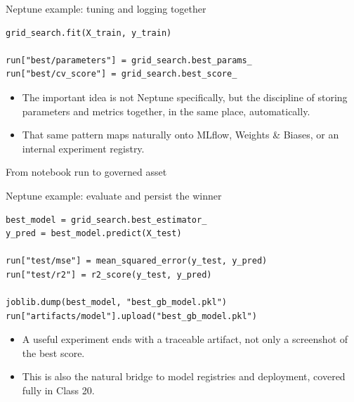 \begin{frame}[fragile]{Neptune example: tuning and logging together}
\begin{lstlisting}[style=coursepython]
grid_search.fit(X_train, y_train)

run["best/parameters"] = grid_search.best_params_
run["best/cv_score"] = grid_search.best_score_
\end{lstlisting}
\begin{itemize}
\item The important idea is not Neptune specifically, but the discipline of storing parameters and metrics together, in the same place, automatically.
\item That same pattern maps naturally onto MLflow, Weights \& Biases, or an internal experiment registry.
\end{itemize}
\coursefooter
\end{frame}

\begin{frame}{From notebook run to governed asset}
\centering
{}
\coursefooter
\end{frame}

\begin{frame}[fragile]{Neptune example: evaluate and persist the winner}
\begin{lstlisting}[style=coursepython]
best_model = grid_search.best_estimator_
y_pred = best_model.predict(X_test)

run["test/mse"] = mean_squared_error(y_test, y_pred)
run["test/r2"] = r2_score(y_test, y_pred)

joblib.dump(best_model, "best_gb_model.pkl")
run["artifacts/model"].upload("best_gb_model.pkl")
\end{lstlisting}
\begin{itemize}
\item A useful experiment ends with a traceable artifact, not only a screenshot of the best score.
\item This is also the natural bridge to model registries and deployment, covered fully in Class 20.
\end{itemize}
\coursefooter
\end{frame}


